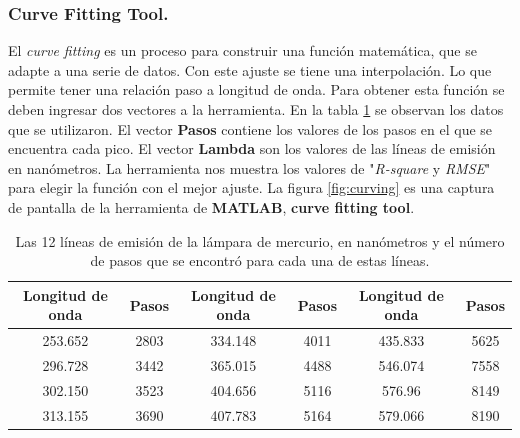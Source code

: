 
\subsubsection{Curve Fitting Tool.} 
El \textit{curve fitting} es un proceso para construir una función matemática, que se adapte a una serie de datos. Con este ajuste se tiene una interpolación. Lo que permite tener una relación paso a longitud de onda. Para obtener esta función se deben ingresar dos vectores a la herramienta. En la tabla \ref{tabla:pasolamda} se observan los datos que se utilizaron. El vector \textbf{Pasos} contiene los valores de los pasos en el que se encuentra cada pico. El vector \textbf{Lambda} son los valores de las líneas de emisión en nanómetros. La herramienta nos muestra los valores de "\textit{R-square} y \textit{RMSE}" para elegir la función con el mejor ajuste.
La figura \ref{fig:curving} es una captura de pantalla de la herramienta de \textbf{MATLAB}, \textbf{curve fitting tool}. 

\begin{table}[h]
	\caption{Las 12 líneas de emisión de la lámpara de mercurio, en nanómetros y el número de pasos que se encontró para cada una de estas líneas.}
	\label{tabla:pasolamda}
	\vspace{12mm}
	\begin{tabular}{|c|c|c|c|c|c|}
		\hline 
		Longitud de onda & Pasos & Longitud de onda & Pasos & Longitud de onda & Pasos \\ 
		\hline 
		253.652 & 2803 & 334.148 & 4011 & 435.833 & 5625 \\ 
		\hline 
		296.728 & 3442 & 365.015 & 4488 & 546.074 & 7558 \\ 
		\hline 
		302.150 & 3523 & 404.656 & 5116 & 576.96 & 8149 \\ 
		\hline 
		313.155 & 3690 & 407.783 & 5164 & 579.066 & 8190 \\ 
		\hline 
	\end{tabular} 
	
\end{table}

